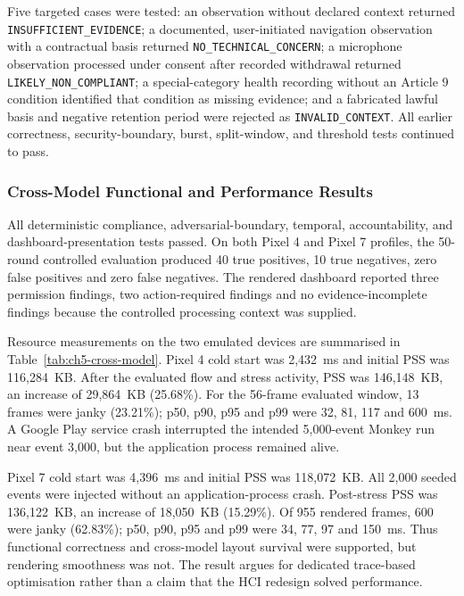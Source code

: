 Five targeted cases were tested: an observation without declared context returned \texttt{INSUFFICIENT\_EVIDENCE}; a documented, user-initiated navigation observation with a contractual basis returned \texttt{NO\_TECHNICAL\_CONCERN}; a microphone observation processed under consent after recorded withdrawal returned \texttt{LIKELY\_NON\_COMPLIANT}; a special-category health recording without an Article 9 condition identified that condition as missing evidence; and a fabricated lawful basis and negative retention period were rejected as \texttt{INVALID\_CONTEXT}. All earlier correctness, security-boundary, burst, split-window, and threshold tests continued to pass.

\subsubsection{Cross-Model Functional and Performance Results}

All deterministic compliance, adversarial-boundary, temporal, accountability, and dashboard-presentation tests passed. On both Pixel 4 and Pixel 7 profiles, the 50-round controlled evaluation produced 40 true positives, 10 true negatives, zero false positives and zero false negatives. The rendered dashboard reported three permission findings, two action-required findings and no evidence-incomplete findings because the controlled processing context was supplied.

Resource measurements on the two emulated devices are summarised in Table~\ref{tab:ch5-cross-model}. Pixel 4 cold start was 2,432~ms and initial PSS was 116,284~KB. After the evaluated flow and stress activity, PSS was 146,148~KB, an increase of 29,864~KB (25.68\%). For the 56-frame evaluated window, 13 frames were janky (23.21\%); p50, p90, p95 and p99 were 32, 81, 117 and 600~ms. A Google Play service crash interrupted the intended 5,000-event Monkey run near event 3,000, but the application process remained alive.

Pixel 7 cold start was 4,396~ms and initial PSS was 118,072~KB. All 2,000 seeded events were injected without an application-process crash. Post-stress PSS was 136,122~KB, an increase of 18,050~KB (15.29\%). Of 955 rendered frames, 600 were janky (62.83\%); p50, p90, p95 and p99 were 34, 77, 97 and 150~ms. Thus functional correctness and cross-model layout survival were supported, but rendering smoothness was not. The result argues for dedicated trace-based optimisation rather than a claim that the HCI redesign solved performance.


